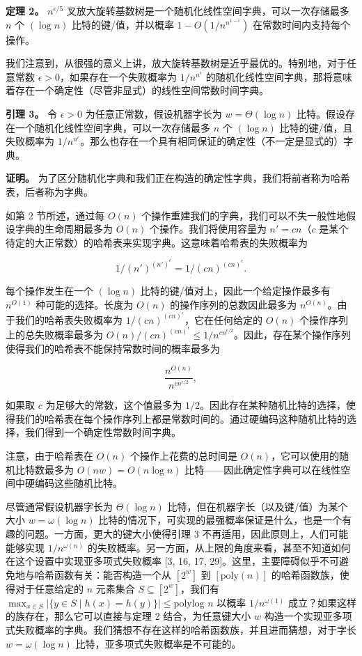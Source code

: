 \documentclass[12pt,a4paper]{ctexart}
\theoremstyle{remark}
\begin{document}
\textbf{定理 2。} $n^{\epsilon/5}$ 叉放大旋转基数树是一个随机化线性空间字典，可以一次存储最多 $n$ 个 $(\log n)$ 比特的键/值，并以概率 $1-O(1/n^{n^{1-\epsilon}})$ 在常数时间内支持每个操作。

我们注意到，从很强的意义上讲，放大旋转基数树是近乎最优的。特别地，对于任意常数 $\epsilon>0$，如果存在一个失败概率为 $1/n^{n^{\epsilon}}$ 的随机化线性空间字典，那将意味着存在一个确定性（尽管非显式）的线性空间常数时间字典。

\textbf{引理 3。} 令 $\epsilon>0$ 为任意正常数，假设机器字长为 $w=\Theta(\log n)$ 比特。假设存在一个随机化线性空间字典，可以一次存储最多 $n$ 个 $(\log n)$ 比特的键/值，且失败概率为 $1/n^{n^{\epsilon}}$。那么也存在一个具有相同保证的确定性（不一定是显式的）字典。

\textbf{证明。} 为了区分随机化字典和我们正在构造的确定性字典，我们将前者称为哈希表，后者称为字典。

如第 2 节所述，通过每 $O(n)$ 个操作重建我们的字典，我们可以不失一般性地假设字典的生命周期最多为 $O(n)$ 个操作。我们将使用容量为 $n'=cn$（$c$ 是某个待定的大正常数）的哈希表来实现字典。这意味着哈希表的失败概率为

$$1/(n')^{(n')^{\epsilon}}=1/(cn)^{(cn)^{\epsilon}}.$$

每个操作发生在一个 $(\log n)$ 比特的键/值对上，因此一个给定操作最多有 $n^{O(1)}$ 种可能的选择。长度为 $O(n)$ 的操作序列的总数因此最多为 $n^{O(n)}$。由于我们的哈希表失败概率为 $1/(cn)^{(cn)^{\epsilon}}$，它在任何给定的 $O(n)$ 个操作序列上的总失败概率最多为 $O(n)/(cn)^{(cn)^{\epsilon}}\leq 1/n^{cn^{\epsilon/2}}$。因此，存在某个操作序列使得我们的哈希表不能保持常数时间的概率最多为

$$\frac{n^{O(n)}}{n^{cn^{\epsilon/2}}},$$

如果取 $c$ 为足够大的常数，这个值最多为 $1/2$。因此存在某种随机比特的选择，使得我们的哈希表在每个操作序列上都是常数时间的。通过硬编码这种随机比特的选择，我们得到一个确定性常数时间字典。

注意，由于哈希表在 $O(n)$ 个操作上花费的总时间是 $O(n)$，它可以使用的随机比特数最多为 $O(nw)=O(n\log n)$ 比特——因此确定性字典可以在线性空间中硬编码这些随机比特。

尽管通常假设机器字长为 $\Theta(\log n)$ 比特，但在机器字长（以及键/值）为某个大小 $w=\omega(\log n)$ 比特的情况下，可实现的最强概率保证是什么，也是一个有趣的问题。一方面，更大的键大小使得引理 3 不再适用，因此原则上，人们可能能够实现 $1/n^{\omega(n)}$ 的失败概率。另一方面，从上限的角度来看，甚至不知道如何在这个设置中实现亚多项式失败概率 [3, 16, 17, 29]。这里，主要障碍似乎不可避免地与哈希函数有关：能否构造一个从 $[2^w]$ 到 $[\text{poly}(n)]$ 的哈希函数族，使得对于任意给定的 $n$ 元素集合 $S\subseteq[2^w]$，我们有 $\max_{x\in S}|\{y\in S\mid h(x)=h(y)\}|\leq\text{polylog } n$ 以概率 $1/n^{\omega(1)}$ 成立？如果这样的族存在，那么它可以直接与定理 2 结合，为任意键大小 $w$ 构造一个实现亚多项式失败概率的字典。我们猜想不存在这样的哈希函数族，并且进而猜想，对于字长 $w=\omega(\log n)$ 比特，亚多项式失败概率是不可能的。
\end{document}
